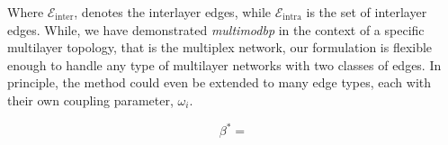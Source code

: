 \documentclass[11pt]{article}
\begin{document}
Where $\mathcal{E}_{\text{inter}}$, denotes the interlayer edges, while $\mathcal{E}_{\text{intra}}$ is the set of interlayer edges.  While, we have demonstrated \textit{multimodbp} in the context of a specific multilayer topology, that is the multiplex network, our formulation is flexible enough to handle any type of multilayer networks with two classes of edges.  In principle, the method could even be extended to many edge types, each with their own coupling parameter, $\omega_i$.  

\begin{equation} \label{eq:bstar}
\beta^*=
\end{equation}


\printbibliography

\end{document}
